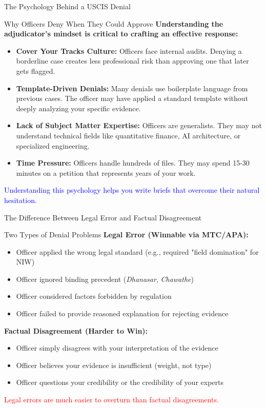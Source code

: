 \documentclass[11pt]{beamer}
\begin{document}
	\begin{frame}{The Psychology Behind a USCIS Denial}
		\scriptsize
		\begin{block}{Why Officers Deny When They Could Approve}
			\textbf{Understanding the adjudicator's mindset is critical to crafting an effective response:}
			\vspace{0.1cm}
			\begin{itemize}
				\item \textbf{Cover Your Tracks Culture:} Officers face internal audits. Denying a borderline case creates less professional risk than approving one that later gets flagged.
				\item \textbf{Template-Driven Denials:} Many denials use boilerplate language from previous cases. The officer may have applied a standard template without deeply analyzing your specific evidence.
				\item \textbf{Lack of Subject Matter Expertise:} Officers are generalists. They may not understand technical fields like quantitative finance, AI architecture, or specialized engineering.
				\item \textbf{Time Pressure:} Officers handle hundreds of files. They may spend 15-30 minutes on a petition that represents years of your work.
			\end{itemize}
			\textcolor{blue}{Understanding this psychology helps you write briefs that overcome their natural hesitation.}
		\end{block}
	\end{frame}
	
	\begin{frame}{The Difference Between Legal Error and Factual Disagreement}
		\scriptsize
		\begin{block}{Two Types of Denial Problems}
			\textbf{Legal Error (Winnable via MTC/APA):}
			\begin{itemize}
				\item Officer applied the wrong legal standard (e.g., required "field domination" for NIW)
				\item Officer ignored binding precedent (\textit{Dhanasar}, \textit{Chawathe})
				\item Officer considered factors forbidden by regulation
				\item Officer failed to provide reasoned explanation for rejecting evidence
			\end{itemize}
			\textbf{Factual Disagreement (Harder to Win):}
			\begin{itemize}
				\item Officer simply disagrees with your interpretation of the evidence
				\item Officer believes your evidence is insufficient (weight, not type)
				\item Officer questions your credibility or the credibility of your experts
			\end{itemize}
			\textcolor{red}{Legal errors are much easier to overturn than factual disagreements.}
		\end{block}
	\end{frame}
	
\end{document}
